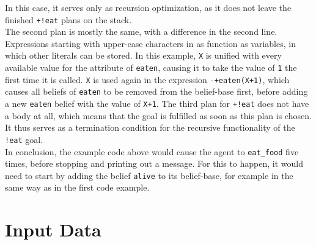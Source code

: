 \documentclass[draft,final]{vutinfth} %
\begin{document}
In this case, it serves only as recursion optimization, as it does not leave the finished \verb|+!eat| plans on the stack. \\
The second plan is mostly the same, with a difference in the second line. 
Expressions starting with upper-case characters in \gls{as} function as variables, in which other literals can be stored. 
In this example, \verb|X| is unified with every available value for the attribute of \verb|eaten|, causing it to take the value of \verb|1| the first time it is called. 
\verb|X| is used again in the expression \verb|-+eaten(X+1)|, which causes all beliefs of \verb|eaten| to be removed from the belief-base first, before adding a new \verb|eaten| belief with the value of \verb|X+1|. 
The third plan for \verb|+!eat| does not have a body at all, which means that the goal is fulfilled as soon as this plan is chosen. 
It thus serves as a termination condition for the recursive functionality of the \verb|!eat| goal. \\
In conclusion, the example code above would cause the agent to \verb|eat_food| five times, before stopping and printing out a message. 
For this to happen, it would need to start by adding the belief \verb|alive| to its belief-base, for example in the same way as in the first code example.

\section{Input Data}
\label{chap:inputdata}
\end{document}

